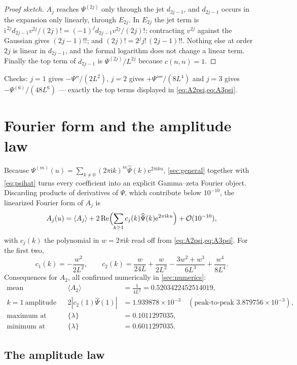 \documentclass[11pt,oneside]{article}
\theoremstyle{definition}
\theoremstyle{remark}
\newcommand{\e}{\mathrm e}
\newcommand{\ii}{\mathrm i}
\newcommand{\bigO}{\mathcal O}
\newcommand{\Psihat}{\widehat\Psi}
\begin{document}
\begin{proof}[Proof sketch]
$A_j$ reaches $\Psi^{(2j)}$ only through the jet $d_{2j-1}$, and $d_{2j-1}$
occurs in the expansion only linearly, through $E_{2j}$.  In $E_{2j}$ the jet
term is $\ii^{\,2j}d_{2j-1}v^{2j}/(2j)!=(-1)^jd_{2j-1}v^{2j}/(2j)!$; contracting
$v^{2j}$ against the Gaussian gives $(2j-1)!!$; and $(2j)!=2^jj!\,(2j-1)!!$.
Nothing else at order $2j$ is linear in $d_{2j-1}$, and the formal logarithm
does not change a linear term.  Finally the top term of $d_{2j-1}$ is
$\Psi^{(2j)}/L^{2j}$ because $c(n,n)=1$.
\end{proof}

Checks: $j=1$ gives $-\Psi''/(2L^2)$, $j=2$ gives $+\Psi''''/(8L^4)$ and $j=3$
gives $-\Psi^{(6)}/(48L^6)$ --- exactly the top terms displayed in
\cref{eq:A2psi,eq:A3psi}.

\section{Fourier form and the amplitude law}\label{sec:fourier}

Because $\Psi^{(m)}(u)=\sum_{k\ne0}(2\pi\ii k)^m\Psihat(k)\e^{2\pi\ii ku}$,
\cref{sec:general} together with \cref{eq:psihat} turns every coefficient into
an explicit Gamma--zeta Fourier object.  Discarding products of derivatives of
$\Psi$, which contribute below $10^{-10}$, the linearized Fourier form of $A_j$
is
\[
  A_j(u)=\langle A_j\rangle
   +2\operatorname{Re}\Bigl(\sum_{k\ge1}c_j(k)\Psihat(k)\e^{2\pi\ii ku}\Bigr)
   +\bigO(10^{-10}),
\]
with $c_j(k)$ the polynomial in $w=2\pi\ii k$ read off from
\cref{eq:A2psi,eq:A3psi}.  For the first two,
\[
  c_1(k)=-\frac{w^2}{2L^2},
  \qquad
  c_2(k)=\frac{w}{24L}+\frac{w}{2L^2}-\frac{3w^2+w^3}{6L^3}+\frac{w^4}{8L^4}.
\]
Consequences for $A_2$, all confirmed numerically in \cref{sec:numerics}:
\[
\begin{aligned}
  \text{mean}&&\langle A_2\rangle&=\frac1{4L^2}=0.5203422452514019,\\
  k=1\ \text{amplitude}&&2|c_2(1)\Psihat(1)|&=1.939878\times10^{-3}
    \quad(\text{peak-to-peak }3.879756\times10^{-3}),\\
  \text{maximum at}&&\{\lambda\}&=0.1011297035,\\
  \text{minimum at}&&\{\lambda\}&=0.6011297035.
\end{aligned}
\]

\subsection{The amplitude law}
\end{document}
